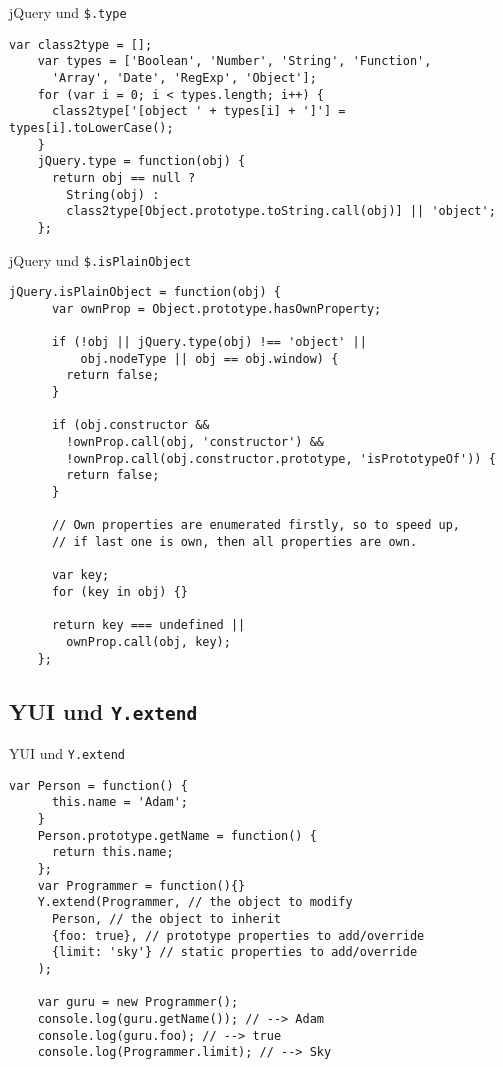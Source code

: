 \begin{frame}[fragile]{jQuery und \texttt{\$.type}}
  \begin{lstlisting}[gobble=4]
    var class2type = [];
    var types = ['Boolean', 'Number', 'String', 'Function',
      'Array', 'Date', 'RegExp', 'Object'];
    for (var i = 0; i < types.length; i++) {
      class2type['[object ' + types[i] + ']'] = types[i].toLowerCase();
    }
    jQuery.type = function(obj) {
      return obj == null ?
        String(obj) :
        class2type[Object.prototype.toString.call(obj)] || 'object';
    };
  \end{lstlisting}
\end{frame}

\begin{frame}[fragile]{jQuery und \texttt{\$.isPlainObject}}
  \begin{lstlisting}[gobble=4]
    jQuery.isPlainObject = function(obj) {
      var ownProp = Object.prototype.hasOwnProperty;
    
      if (!obj || jQuery.type(obj) !== 'object' ||
          obj.nodeType || obj == obj.window) {
        return false;
      }
    
      if (obj.constructor &&
        !ownProp.call(obj, 'constructor') &&
        !ownProp.call(obj.constructor.prototype, 'isPrototypeOf')) {
        return false;
      }
    
      // Own properties are enumerated firstly, so to speed up,
      // if last one is own, then all properties are own.
    
      var key;
      for (key in obj) {}
    
      return key === undefined ||
        ownProp.call(obj, key);
    };
  \end{lstlisting}
\end{frame}

\subsection{YUI und \texttt{Y.extend}}

\begin{frame}[fragile]{YUI und \texttt{Y.extend}}
  \begin{lstlisting}[gobble=4]
    var Person = function() {
      this.name = 'Adam';
    }
    Person.prototype.getName = function() {
      return this.name;
    };
    var Programmer = function(){}
    Y.extend(Programmer, // the object to modify
      Person, // the object to inherit
      {foo: true}, // prototype properties to add/override
      {limit: 'sky'} // static properties to add/override
    );
    
    var guru = new Programmer();
    console.log(guru.getName()); // --> Adam
    console.log(guru.foo); // --> true
    console.log(Programmer.limit); // --> Sky
  \end{lstlisting}
\end{frame}

